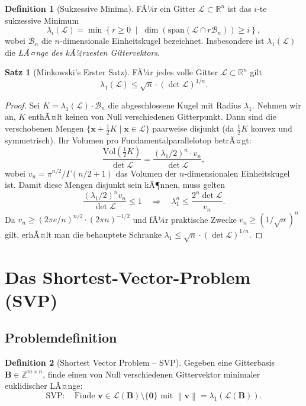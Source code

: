 ﻿\documentclass[a4paper,12pt]{article}
\theoremstyle{definition}
\newtheorem{definition}{Definition}
\newtheorem{satz}{Satz}
\newcommand{\Z}{\mathbb{Z}}
\newcommand{\R}{\mathbb{R}}
\newcommand{\Lat}{\mathcal{L}}
\newcommand{\B}{\mathbf{B}}
\newcommand{\norm}[1]{\left\|#1\right\|}
\begin{document}
\begin{definition}[Sukzessive Minima]
FÃ¼r ein Gitter $\Lat \subset \R^n$ ist das $i$-te sukzessive Minimum
\[
    \lambda_i(\Lat) = \min \left\{ r \geq 0 \;\middle|\; \dim\left(\mathrm{span}\left(\Lat \cap r\mathcal{B}_n\right)\right) \geq i \right\},
\]
wobei $\mathcal{B}_n$ die $n$-dimensionale Einheitskugel bezeichnet.
Insbesondere ist $\lambda_1(\Lat)$ die \emph{LÃ¤nge des kÃ¼rzesten Gittervektors}.
\end{definition}

\begin{satz}[Minkowski's Erster Satz]
\label{satz:minkowski}
FÃ¼r jedes volle Gitter $\Lat \subset \R^n$ gilt
\[
    \lambda_1(\Lat) \leq \sqrt{n} \cdot (\det \Lat)^{1/n}.
\]
\end{satz}

\begin{proof}
Sei $K = \lambda_1(\Lat) \cdot \mathcal{B}_n$ die abgeschlossene Kugel mit Radius $\lambda_1$.
Nehmen wir an, $K$ enthÃ¤lt keinen von Null verschiedenen Gitterpunkt.
Dann sind die verschobenen Mengen $\{\mathbf{x} + \tfrac{1}{2}K \mid \mathbf{x} \in \Lat\}$
paarweise disjunkt (da $\tfrac{1}{2}K$ konvex und symmetrisch).
Ihr Volumen pro Fundamentalparallelotop betrÃ¤gt:
\[
    \frac{\mathrm{Vol}(\tfrac{1}{2}K)}{\det \Lat} = \frac{(\lambda_1/2)^n \cdot v_n}{\det \Lat},
\]
wobei $v_n = \pi^{n/2}/\Gamma(n/2+1)$ das Volumen der $n$-dimensionalen Einheitskugel ist.
Damit diese Mengen disjunkt sein kÃ¶nnen, muss gelten
\[
    \frac{(\lambda_1/2)^n v_n}{\det \Lat} \leq 1
    \quad \Longrightarrow \quad
    \lambda_1^n \leq \frac{2^n \det \Lat}{v_n}.
\]
Da $v_n \geq (2\pi e/n)^{n/2} \cdot (2\pi n)^{-1/2}$ und fÃ¼r praktische Zwecke
$v_n \geq (1/\sqrt{n})^n$ gilt, erhÃ¤lt man die behauptete Schranke
$\lambda_1 \leq \sqrt{n} \cdot (\det \Lat)^{1/n}$.
\end{proof}

\section{Das Shortest-Vector-Problem (SVP)}

\subsection{Problemdefinition}

\begin{definition}[Shortest Vector Problem -- SVP]
Gegeben eine Gitterbasis $\B \in \Z^{m \times n}$, finde einen von Null verschiedenen
Gittervektor minimaler euklidischer LÃ¤nge:
\[
    \mathrm{SVP:} \quad \text{Finde } \mathbf{v} \in \Lat(\B) \setminus \{\mathbf{0}\}
                        \text{ mit } \norm{\mathbf{v}} = \lambda_1(\Lat(\B)).
\]
\end{definition}
\end{document}
